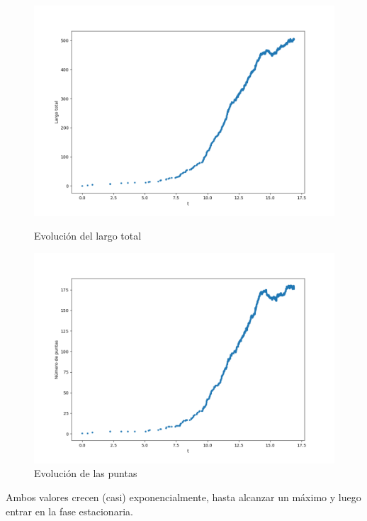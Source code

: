 \documentclass{article}
\begin{document}
\begin{figure}[h!]
\begin{minipage}{0.5\textwidth}
    \centering
    \includegraphics[width=\textwidth]{graficos_inst/largo_vs_tiempo_principio.png}
    \caption[]{Evolución del largo total}
    \label{fig:l_vs_tiempo_princ}
\end{minipage} 
\begin{minipage}{0.5\textwidth}
    \centering
    \includegraphics[width=\textwidth]{graficos_inst/N_vs_tiempo_principio.png}
    \caption[]{Evolución de las puntas}
    \label{fig:N_vs_tiempo_princ}
\end{minipage}   
\end{figure}

Ambos valores crecen (casi) exponencialmente, hasta alcanzar un máximo y luego entrar en la fase estacionaria.
\end{document}
